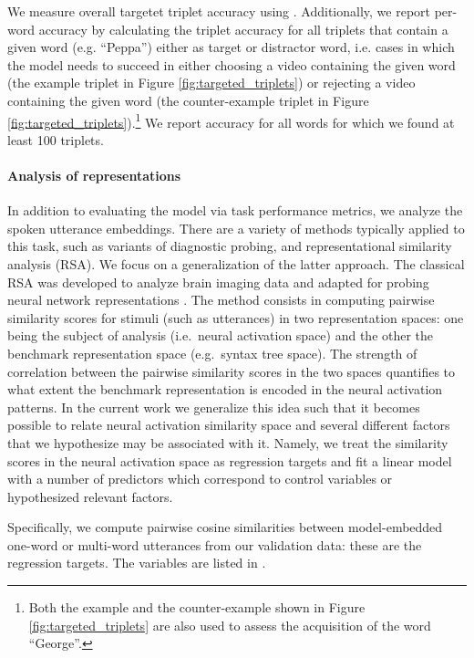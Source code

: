 We measure overall targetet triplet accuracy using
. Additionally, we report per-word accuracy by
calculating the triplet accuracy for all triplets that contain a given
word (e.g. ``Peppa'') either as target or distractor word, i.e. cases
in which the model needs to succeed in either choosing a video
containing the given word (the example triplet in Figure
\ref{fig:targeted_triplets}) or rejecting a video containing the given
word (the counter-example triplet in Figure
\ref{fig:targeted_triplets}).\footnote{Both the example and the
  counter-example shown in Figure \ref{fig:targeted_triplets} are also
  used to assess the acquisition of the word ``George''.}  We report
accuracy for all words for which we found at least 100 triplets.

\paragraph{Analysis of representations}
In addition to evaluating the model via task performance metrics, we
analyze the spoken utterance embeddings. There are a variety of
methods typically applied to this task, such as variants of diagnostic
probing, and representational similarity analysis (RSA). We focus on
a generalization of the latter approach.
The classical RSA was developed to analyze brain imaging data
\citep{kriegeskorte2008representational} and adapted for probing
neural network representations
\citep[e.g.][]{chrupala-alishahi-2019-correlating}. The method
consists in computing pairwise similarity scores for stimuli (such as
utterances) in two representation spaces: one being the subject of
analysis (i.e.\ neural activation space) and the other the benchmark
representation space (e.g.\ syntax tree space). The strength of
correlation between the pairwise similarity scores in the two spaces
quantifies to what extent the benchmark representation is encoded in
the neural activation patterns. In the current work we generalize this
idea such that it becomes possible to relate
neural activation similarity space and several different factors that
we hypothesize may be associated with it. Namely, we treat the
similarity scores in the neural activation space as regression targets
and fit a linear model with a number of predictors which 
correspond to control variables or hypothesized relevant factors.

Specifically, we compute pairwise cosine similarities between
model-embedded one-word or multi-word utterances from our validation data: these are
the regression targets. The variables are listed in .

